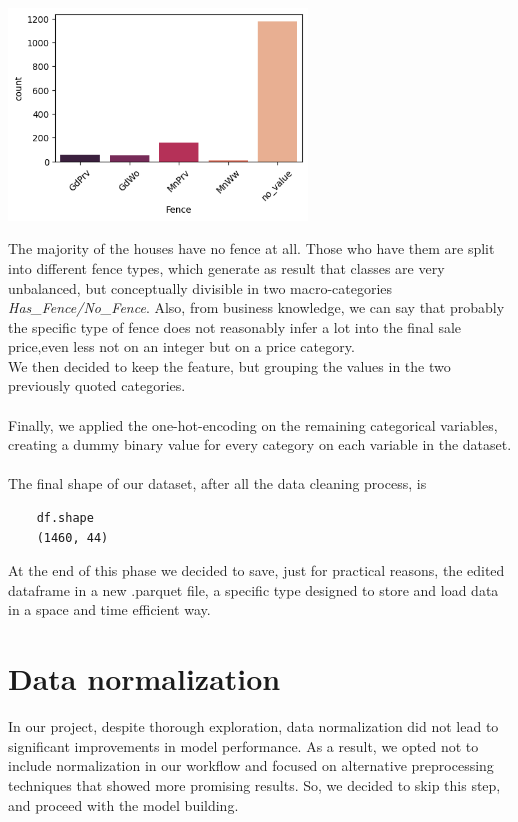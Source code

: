 \begin{center}
    \includegraphics*[width=300px]{imgs/Fence.png}
    \label{Fence distribution}
\end{center}
The majority of the houses have no fence at all. Those who have them are split into different fence types, which generate as result that classes are very unbalanced, but conceptually divisible in two macro-categories \emph{Has\_Fence/No\_Fence}.
Also, from business knowledge, we can say that probably the specific type of fence does not reasonably infer a lot into the final sale price,even less not on an integer but on a price category. \\
We then decided to keep the feature, but grouping the values in the two previously quoted categories.\\
\\Finally, we applied the one-hot-encoding on the remaining categorical variables, creating a dummy binary value for every category on each variable in the dataset.\\
\\The final shape of our dataset, after all the data cleaning process, is 
\begin{verbatim}
    df.shape
    (1460, 44)
\end{verbatim}
At the end of this phase we decided to save, just for practical reasons, the edited dataframe in a new .parquet file, a specific type designed to store and load data in a space and time efficient way.

\section{Data normalization}
In our project, despite thorough exploration, data normalization did not lead to significant improvements in model performance. As a result, we opted not to include normalization in our workflow and focused on alternative preprocessing techniques that showed more promising results.
So, we decided to skip this step, and proceed with the model building.